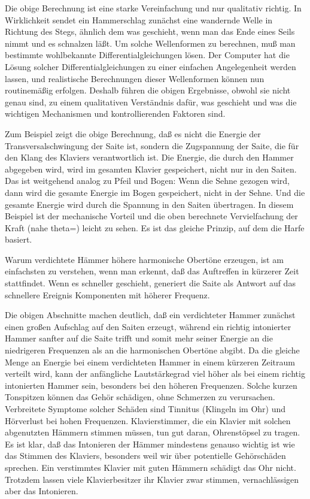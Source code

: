 Die obige Berechnung ist eine starke Vereinfachung und nur qualitativ richtig.
 In Wirklichkeit sendet ein Hammerschlag zunächst eine wandernde Welle in Richtung des Stegs, ähnlich dem was geschieht, wenn man das Ende eines Seils nimmt und es schnalzen läßt.
 Um solche Wellenformen zu berechnen, muß man bestimmte wohlbekannte Differentialgleichungen lösen.
 Der Computer hat die Lösung solcher Differentialgleichungen zu einer einfachen Angelegenheit werden lassen, und realistische Berechnungen dieser Wellenformen können nun routinemäßig erfolgen.
 Deshalb führen die obigen Ergebnisse, obwohl sie nicht genau sind, zu einem qualitativen Verständnis dafür, was geschieht und was die wichtigen Mechanismen und kontrollierenden Faktoren sind.
 

Zum Beispiel zeigt die obige Berechnung, daß es nicht die Energie der Transversalschwingung der Saite ist, sondern die Zugspannung der Saite, die für den Klang des Klaviers verantwortlich ist.
 Die Energie, die durch den Hammer abgegeben wird, wird im gesamten Klavier gespeichert, nicht nur in den Saiten.
 Das ist weitgehend analog zu Pfeil und Bogen: Wenn die Sehne gezogen wird, dann wird die gesamte Energie im Bogen gespeichert, nicht in der Sehne.
 Und die gesamte Energie wird durch die Spannung in den Saiten übertragen.
 In diesem Beispiel ist der mechanische Vorteil und die oben berechnete Vervielfachung der Kraft (nahe theta\nolinebreak=) leicht zu sehen.
 Es ist das gleiche Prinzip, auf dem die Harfe basiert.
 

Warum verdichtete Hämmer höhere harmonische Obertöne erzeugen, ist am einfachsten zu verstehen, wenn man erkennt, daß das Auftreffen in kürzerer Zeit stattfindet.
 Wenn es schneller geschieht, generiert die Saite als Antwort auf das schnellere Ereignis Komponenten mit höherer Frequenz.
 

Die obigen Abschnitte machen deutlich, daß ein verdichteter Hammer zunächst einen großen Aufschlag auf den Saiten erzeugt, während ein richtig intonierter Hammer sanfter auf die Saite trifft und somit mehr seiner Energie an die niedrigeren Frequenzen als an die harmonischen Obertöne abgibt.
 Da die gleiche Menge an Energie bei einem verdichteten Hammer in einem kürzeren Zeitraum verteilt wird, kann der anfängliche Lautstärkegrad viel höher als bei einem richtig intonierten Hammer sein, besonders bei den höheren Frequenzen.
 Solche kurzen Tonspitzen können das Gehör schädigen, ohne Schmerzen zu verursachen.
 Verbreitete Symptome solcher Schäden sind Tinnitus (Klingeln im Ohr) und Hörverlust bei hohen Frequenzen.
 Klavierstimmer, die ein Klavier mit solchen abgenutzten Hämmern stimmen müssen, tun gut daran, Ohrenstöpsel zu tragen.
 Es ist klar, daß das Intonieren der Hämmer mindestens genauso wichtig ist wie das Stimmen des Klaviers, besonders weil wir über potentielle Gehörschäden sprechen.
 Ein verstimmtes Klavier mit guten Hämmern schädigt das Ohr nicht.
 Trotzdem lassen viele Klavierbesitzer ihr Klavier zwar stimmen, vernachlässigen aber das Intonieren.
 

